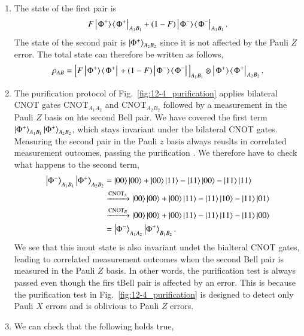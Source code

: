 \begin{solution}
\begin{enumerate}[label=(\alph*)]
    \item The state of the first pair is
    \begin{equation*}
        F \left|\left. \Phi^+ \rangle\right.\!\langle\left. \Phi^+ \right|\right. _{A_1B_1} + (1-F) \left|\left. \Phi^- \rangle\right.\!\langle\left. \Phi^- \right|\right. _{A_1B_1}.
    \end{equation*}
    The state of the second pair is $\left| \Phi^+ \right\rangle_{A_2B_2}$ since it is not affected by the Pauli $Z$ error. The total state can therefore be written as follows,
    \begin{equation*}
        \rho_{AB} = \left[ F \left|\left. \Phi^+ \rangle\right.\!\langle\left. \Phi^+ \right|\right.  + (1-F) \left|\left. \Phi^- \rangle\right.\!\langle\left. \Phi^- \right|\right.  \right]_{A_1B_1} \otimes \left|\left. \Phi^+ \rangle\right.\!\langle\left. \Phi^+ \right|\right. _{A_2B_2}.
    \end{equation*}
    \item The purification protocol of Fig.~\ref{fig:12-4_purification} applies bilateral CNOT gates CNOT$_{A_1A_2}$ and CNOT$_{A_2B_2}$ followed by a measurement in the Pauli $Z$ basis on hte second Bell pair.
    We have covered the first term $\left| \Phi^+ \right\rangle_{A_1B_1}\left| \Phi^+ \right\rangle_{A_2B_2}$, which stays invariant under the bilateral CNOT gates. Measuring the second pair in the Pauli $z$ basis always reuslts in correlated measurement outcomes, passing the purification .
    We therefore have to check what happens to the second term,
    \begin{align*}
        \left| \Phi^- \right\rangle_{A_1B_1}\left| \Phi^+ \right\rangle_{A_2B_2} & = \left| 00 \right\rangle\left| 00 \right\rangle + \left| 00 \right\rangle\left| 11 \right\rangle - \left| 11 \right\rangle\left| 00 \right\rangle - \left| 11 \right\rangle\left| 11 \right\rangle \\
        & \xrightarrow{\text{CNOT}_A} \left| 00 \right\rangle\left| 00 \right\rangle + \left| 00 \right\rangle\left| 11 \right\rangle - \left| 11 \right\rangle\left| 10 \right\rangle - \left| 11 \right\rangle\left| 01 \right\rangle \\
        & \xrightarrow{\text{CNOT}_B} \left| 00 \right\rangle\left| 00 \right\rangle + \left| 00 \right\rangle\left| 11 \right\rangle - \left| 11 \right\rangle\left| 11 \right\rangle - \left| 11 \right\rangle\left| 00 \right\rangle \\
        & = \left| \Phi^- \right\rangle_{A_1A_2}\left| \Phi^+ \right\rangle_{B_1B_2}.
    \end{align*}
    We see that this inout state is also invariant undet the bialteral CNOT gates, leading to correlated measurement outcomes when the second Bell pair is measured in the Pauli $Z$ basis.
    In other words, the purification test is always passed even though the firs tBell pair is affected by an error.
    This is because the purification test in Fig.~\ref{fig:12-4_purification} is designed to detect only Pauli $X$ errors and is oblivious to Pauli $Z$ errors.
    \item We can check that the following holds true,

\end{enumerate}
\end{solution}
